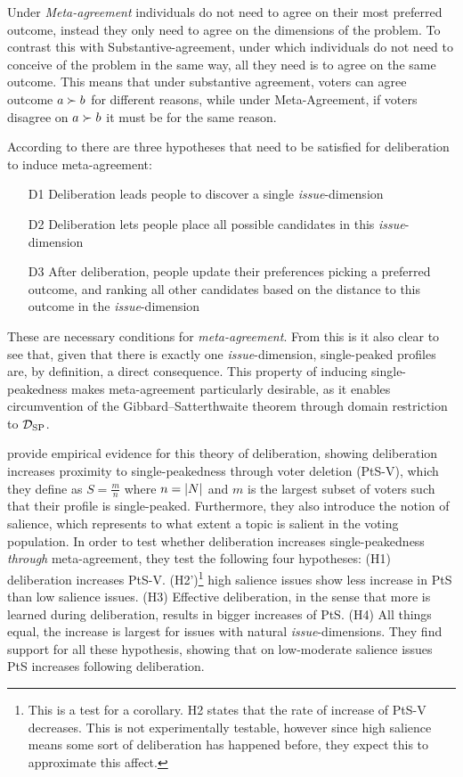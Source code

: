 Under \emph{Meta-agreement} individuals do not need to agree on their most
preferred outcome, instead they only need to agree on the dimensions of the
problem. To contrast this with Substantive-agreement, under which individuals
do not need to conceive of the problem in the same way, all they need is to
agree on the same outcome. This means that under substantive agreement, voters
can agree outcome $a \succ b$ for different reasons, while under
Meta-Agreement, if voters disagree on $a \succ b$ it must be for the same
reason.

According to \citet{listTwoConceptsAgreement2002} there are three hypotheses that need to be satisfied for deliberation to induce meta-agreement:
\begin{enumerate}
	\label{list:meta-agreement-checklist}
	\setlength\itemsep{1px}
	\item [D1] Deliberation leads people to discover a single \emph{issue}-dimension
	\item [D2] Deliberation lets people place all possible candidates in this \emph{issue}-dimension
	\item [D3] After deliberation, people update their preferences picking
	      a preferred outcome, and ranking all other candidates based on the distance to this outcome in the \emph{issue}-dimension
\end{enumerate}

These are necessary conditions for \emph{meta-agreement}. From this is it also
clear to see that, given that there is exactly one \emph{issue}-dimension,
single-peaked profiles are, by definition, a direct consequence. This property
of inducing single-peakedness makes meta-agreement particularly desirable, as
it enables circumvention of the Gibbard–Satterthwaite theorem
\citep{gibbardManipulationVotingSchemes1973,
	satterthwaiteStrategyproofnessArrowsConditions1975} through
domain restriction to $\mathcal{D}_{\textnormal{SP}}$.

\citet{listDeliberationSinglePeakednessPossibility2013} provide empirical
evidence for this theory of deliberation, showing deliberation increases
proximity to single-peakedness through voter deletion (PtS-V), which they define as $S= \frac{m}{n}$
where $n = |N|$ and $m$ is the largest subset of voters such that their
profile is single-peaked. Furthermore, they also introduce the notion of
salience, which represents to what extent a topic is salient in the voting
population. In order to test whether deliberation increases single-peakedness
\emph{through} meta-agreement, they test the following four hypotheses: (H1)
deliberation increases PtS-V. (H2')\footnote{This is a
	test for a corollary. H2 states that the rate of increase of PtS-V decreases. This is not experimentally testable, however since
	high salience means some sort of deliberation has happened before, they expect
	this to approximate this affect.} high salience issues show less increase in
PtS than low salience issues. (H3) Effective deliberation, in the sense that
more is learned during deliberation, results in bigger increases of PtS. (H4)
All things equal, the increase is largest for issues with natural
\emph{issue}-dimensions. They find support for all these hypothesis, showing
that on low-moderate salience issues PtS increases following deliberation.

